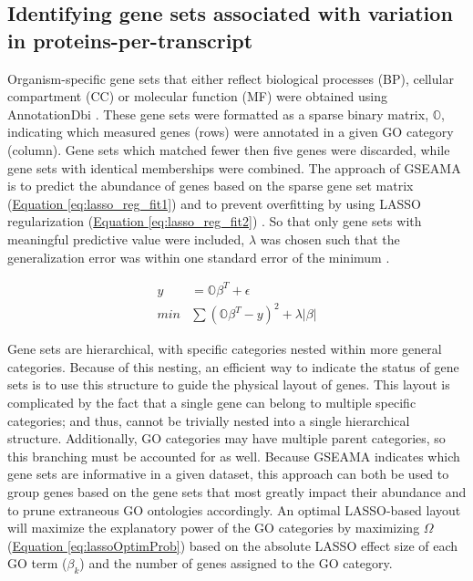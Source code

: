\subsection*{Identifying gene sets associated with variation in proteins-per-transcript}

Organism-specific gene sets that either reflect biological processes (BP), cellular compartment (CC) or molecular function (MF) were obtained using AnnotationDbi \cite{Pages:2008us}. These gene sets were formatted as a sparse binary matrix, $\mathbb{O}$, indicating which measured genes (rows) were annotated in a given GO category (column). Gene sets which matched fewer then five genes were discarded, while gene sets with identical memberships were combined. The approach of GSEAMA is to predict the abundance of genes based on the sparse gene set matrix (\hyperref[eq:lasso_reg_fit1]{Equation \ref{eq:lasso_reg_fit1}}) and to prevent overfitting by using LASSO regularization (\hyperref[eq:lasso_reg_fit2]{Equation \ref{eq:lasso_reg_fit2}}) \cite{Tibshirani:1996wb}. So that only gene sets with meaningful predictive value were included, $\lambda$ was chosen such that the generalization error was within one standard error of the minimum \cite{Friedman:2009ub}.

\begin{subequations}
\begin{align}
y &= \mathbb{O}\beta^{T} + \epsilon\label{eq:lasso_reg_fit1}\\
min &\sum\left(\mathbb{O}\beta^{T} - y\right)^{2} + \lambda |\beta |\label{eq:lasso_reg_fit2}
\end{align}
\end{subequations}

Gene sets are hierarchical, with specific categories nested within more general categories. Because of this nesting, an efficient way to indicate the status of gene sets is to use this structure to guide the physical layout of genes. This layout is complicated by the fact that a single gene can belong to multiple specific categories; and thus, cannot be trivially nested into a single hierarchical structure. Additionally, GO categories may have multiple parent categories, so this branching must be accounted for as well. Because GSEAMA indicates which gene sets are informative in a given dataset, this approach can both be used to group genes based on the gene sets that most greatly impact their abundance and to prune extraneous GO ontologies accordingly. An optimal LASSO-based layout will maximize the explanatory power of the GO categories by maximizing $\Omega$ (\hyperref[eq:lassoOptimProb]{Equation \ref{eq:lassoOptimProb}}) based on the absolute LASSO effect size of each GO term ($\beta_{k}$) and the number of genes assigned to the GO category.

